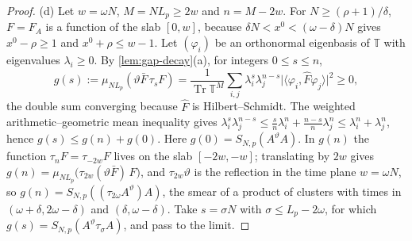 \documentclass[11pt,a4paper]{amsart}
\theoremstyle{definition}
\theoremstyle{remark}
\numberwithin{equation}{section}
\DeclareMathOperator{\Tr}{Tr}        %
\newcommand{\ip}[2]{\langle #1,#2\rangle}  %
\newcommand{\abs}[1]{\lvert #1\rvert}      %
\newcommand{\TT}{\mathbb{T}}               %
\newcommand{\Lp}{L_p}                      %
\begin{document}
\begin{proof}
(d) Let $w=\omega N$, $M=N\Lp\ge2w$ and $n=M-2w$. For $N\ge(\rho+1)/\delta$, $F=F_A$ is a function of the slab $[0,w]$, because $\delta N<x^0<(\omega-\delta)N$ gives $x^0-\rho\ge1$ and $x^0+\rho\le w-1$. Let $(\varphi_i)$ be an orthonormal eigenbasis of $\TT$ with eigenvalues $\lambda_i\ge0$. By \cref{lem:gap-decay}(a), for integers $0\le s\le n$,
\[
g(s):=\mu_{N\Lp}(\vartheta\bar F\,\tau_sF)=\frac{1}{\Tr\TT^M}\sum_{i,j}\lambda_i^s\lambda_j^{n-s}\abs{\ip{\varphi_i}{\hat F\varphi_j}}^2\ge0,
\]
the double sum converging because $\hat F$ is Hilbert--Schmidt. The weighted arithmetic--geometric mean inequality gives $\lambda_i^s\lambda_j^{n-s}\le\frac sn\lambda_i^n+\frac{n-s}n\lambda_j^n\le\lambda_i^n+\lambda_j^n$, hence $g(s)\le g(n)+g(0)$. Here $g(0)=S_{N,p}(A^\vartheta A)$. In $g(n)$ the function $\tau_nF=\tau_{-2w}F$ lives on the slab $[-2w,-w]$; translating by $2w$ gives $g(n)=\mu_{N\Lp}\bigl(\tau_{2w}(\vartheta\bar F)\,F\bigr)$, and $\tau_{2w}\vartheta$ is the reflection in the time plane $w=\omega N$, so $g(n)=S_{N,p}((\tau_{2\omega}A^\vartheta)A)$, the smear of a product of clusters with times in $(\omega+\delta,2\omega-\delta)$ and $(\delta,\omega-\delta)$. Take $s=\sigma N$ with $\sigma\le\Lp-2\omega$, for which $g(s)=S_{N,p}(A^\vartheta\tau_\sigma A)$, and pass to the limit.


\end{proof}
\end{document}
